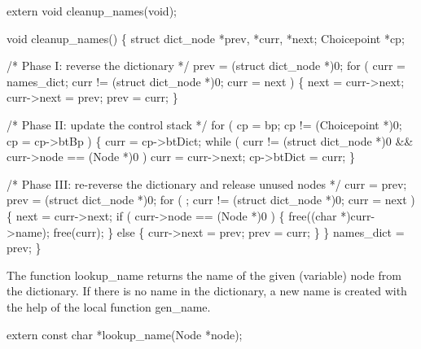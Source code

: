 
\nwenddocs{}\plusendmoddef\nwstartdeflinemarkup{}\nwenddeflinemarkup
extern void cleanup_names(void);

\nwendcode{}\nwdocspar
\nwenddocs{}\plusendmoddef\nwstartdeflinemarkup{}\nwenddeflinemarkup
void
cleanup_names()
\{
    struct dict_node *prev, *curr, *next;
    Choicepoint      *cp;

    /* Phase I: reverse the dictionary */
    prev = (struct dict_node *)0;
    for ( curr = names_dict; curr != (struct dict_node *)0; curr = next )
    \{
        next       = curr->next;
        curr->next = prev;
        prev       = curr;
    \}

    /* Phase II: update the control stack */
    for ( cp = bp; cp != (Choicepoint *)0; cp = cp->btBp )
    \{
        curr = cp->btDict;
        while ( curr != (struct dict_node *)0 && curr->node == (Node *)0 )
            curr = curr->next;
        cp->btDict = curr;
    \}

    /* Phase III: re-reverse the dictionary and release unused nodes */
    curr = prev;
    prev = (struct dict_node *)0;
    for ( ; curr != (struct dict_node *)0; curr = next )
    \{
        next = curr->next;
        if ( curr->node == (Node *)0 )
        \{
            free((char *)curr->name);
            free(curr);
        \}
        else
        \{
            curr->next = prev;
            prev       = curr;
        \}
    \}
    names_dict = prev;
\}

\nwendcode{}\nwdocspar
The function {\Tt{}lookup{\_}name\nwendquote} returns the name of the given (variable)
node from the dictionary. If there is no name in the dictionary, a new
name is created with the help of the local function {\Tt{}gen{\_}name\nwendquote}.

\nwenddocs{}\plusendmoddef\nwstartdeflinemarkup{}\nwenddeflinemarkup
extern const char *lookup_name(Node *node);

